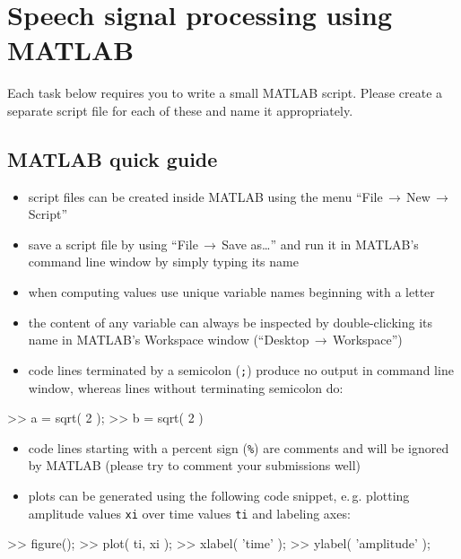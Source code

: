 \section*{Speech signal processing using MATLAB}

\noindent Each task below requires you to write a small MATLAB script. Please create a separate script file for each of these and name it appropriately.

\subsection*{MATLAB quick guide}
\begin{itemize}
	\item script files can be created inside MATLAB using the menu ``File$\,\rightarrow\,$New$\,\rightarrow\,$Script''
	\item save a script file by using ``File$\,\rightarrow\,$Save as\ldots'' and run it in MATLAB's command line window by simply typing its name
	\item when computing values use unique variable names beginning with a letter
	\item the content of any variable can always be inspected by double-clicking its name in MATLAB's Workspace window (``Desktop$\,\rightarrow\,$Workspace'')
	\item code lines terminated by a semicolon (\texttt{;}) produce no output in command line window, whereas lines without terminating semicolon do:
\end{itemize}
\begin{code}
>> a = sqrt( 2 ); \color{medium}%
>> b = sqrt( 2 ) \color{medium}%
\end{code}
\begin{itemize}
	\item code lines starting with a percent sign (\texttt{\%}) are comments and will be ignored by MATLAB (please try to comment your submissions well)
	\item plots can be generated using the following code snippet, e.\,g. plotting amplitude values \texttt{xi} over time values \texttt{ti} and labeling axes:
\end{itemize}
\begin{code}
>> figure(); \color{medium}%
>> plot( ti, xi ); \color{medium}%
>> xlabel( 'time' ); \color{medium}%
>> ylabel( 'amplitude' ); \color{medium}%
\end{code}
